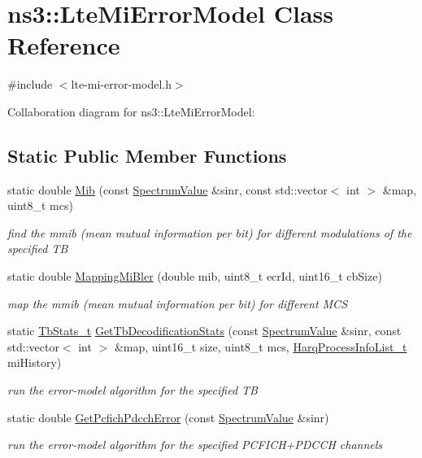 \hypertarget{classns3_1_1LteMiErrorModel}{}\section{ns3\+:\+:Lte\+Mi\+Error\+Model Class Reference}
\label{classns3_1_1LteMiErrorModel}


{\ttfamily \#include $<$lte-\/mi-\/error-\/model.\+h$>$}



Collaboration diagram for ns3\+:\+:Lte\+Mi\+Error\+Model\+:
\subsection*{Static Public Member Functions}
\begin{DoxyCompactItemize}
\item 
static double \hyperlink{classns3_1_1LteMiErrorModel_aeb98520a67e7e4ab119bbc8c70727f1b}{Mib} (const \hyperlink{classns3_1_1SpectrumValue}{Spectrum\+Value} \&sinr, const std\+::vector$<$ int $>$ \&map, uint8\+\_\+t mcs)
\begin{DoxyCompactList}\small\item\em find the mmib (mean mutual information per bit) for different modulations of the specified TB \end{DoxyCompactList}\item 
static double \hyperlink{classns3_1_1LteMiErrorModel_a4cc7a5e5933dab248c3c6aab8bd34206}{Mapping\+Mi\+Bler} (double mib, uint8\+\_\+t ecr\+Id, uint16\+\_\+t cb\+Size)
\begin{DoxyCompactList}\small\item\em map the mmib (mean mutual information per bit) for different M\+CS \end{DoxyCompactList}\item 
static \hyperlink{structns3_1_1TbStats__t}{Tb\+Stats\+\_\+t} \hyperlink{classns3_1_1LteMiErrorModel_a9b4bb57209595fa7100a13de1618b130}{Get\+Tb\+Decodification\+Stats} (const \hyperlink{classns3_1_1SpectrumValue}{Spectrum\+Value} \&sinr, const std\+::vector$<$ int $>$ \&map, uint16\+\_\+t size, uint8\+\_\+t mcs, \hyperlink{namespacens3_a8e9da9f7a4e5c0954a109b0e1dc36e40}{Harq\+Process\+Info\+List\+\_\+t} mi\+History)
\begin{DoxyCompactList}\small\item\em run the error-\/model algorithm for the specified TB \end{DoxyCompactList}\item 
static double \hyperlink{classns3_1_1LteMiErrorModel_aafb97369cd64898fca6da09d9a881c06}{Get\+Pcfich\+Pdcch\+Error} (const \hyperlink{classns3_1_1SpectrumValue}{Spectrum\+Value} \&sinr)
\begin{DoxyCompactList}\small\item\em run the error-\/model algorithm for the specified P\+C\+F\+I\+C\+H+\+P\+D\+C\+CH channels \end{DoxyCompactList}\end{DoxyCompactItemize}


